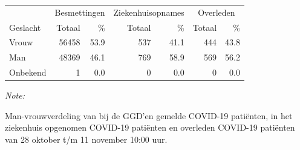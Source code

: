 \documentclass[
  english,
  man,floatsintext]{apa6}
\begin{document}
\begin{table}[H]
\centering\begingroup\fontsize{11}{13}\selectfont

\begin{threeparttable}
\begin{tabular}{lrrrrrr}
\toprule
\multicolumn{1}{c}{ } & \multicolumn{2}{c}{Besmettingen} & \multicolumn{2}{c}{Ziekenhuisopnames} & \multicolumn{2}{c}{Overleden} \\
\cmidrule(l{3pt}r{3pt}){2-3} \cmidrule(l{3pt}r{3pt}){4-5} \cmidrule(l{3pt}r{3pt}){6-7}
Geslacht & Totaal & \% & Totaal & \% & Totaal & \%\\
\midrule
Vrouw & 56458 & 53.9 & 537 & 41.1 & 444 & 43.8\\
Man & 48369 & 46.1 & 769 & 58.9 & 569 & 56.2\\
Onbekend & 1 & 0.0 & 0 & 0.0 & 0 & 0.0\\
\bottomrule
\end{tabular}
\begin{tablenotes}
\item \textit{Note: } 
\item Man-vrouwverdeling van bij de GGD’en gemelde COVID-19 patiënten, in het ziekenhuis opgenomen COVID-19 patiënten en overleden COVID-19 patiënten van 28 oktober t/m 11 november 10:00 uur.
\end{tablenotes}
\end{threeparttable}
\endgroup{}
\end{table}
\newpage
\end{document}
